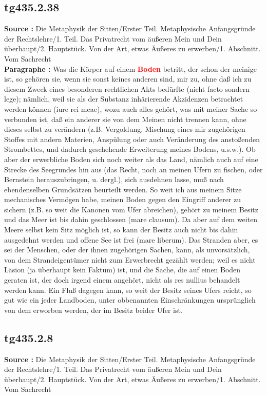 \documentclass[a4paper,12pt,twoside]{book}
\newcommand{\match}[1]{\textcolor{red}{\textbf{#1}}}
\begin{document}
	\subsection*{tg435.2.38} 
	\textbf{Source : }Die Metaphysik der Sitten/Erster Teil. Metaphysische Anfangsgründe der Rechtslehre/1. Teil. Das Privatrecht vom äußeren Mein und Dein überhaupt/2. Hauptstück. Von der Art, etwas Äußeres zu erwerben/1. Abschnitt. Vom Sachrecht\\  
	
	\textbf{Paragraphe : }Was die Körper auf einem \match{Boden} betritt, der schon der meinige ist, so gehören sie, wenn sie sonst keines anderen sind, mir zu, ohne daß ich zu diesem Zweck eines besonderen rechtlichen Akts bedürfte (nicht facto sondern lege); nämlich, weil sie als der Substanz inhärierende Akzidenzen betrachtet werden können (iure rei  meae), wozu auch alles gehört, was mit meiner Sache so verbunden ist, daß ein anderer sie von dem Meinen nicht trennen kann, ohne dieses selbst zu verändern (z.B. Vergoldung, Mischung eines mir zugehörigen Stoffes mit andern Materien, Anspülung oder auch Veränderung des anstoßenden Strombettes, und dadurch geschehende Erweiterung meines Bodens, u.s.w.). Ob aber der erwerbliche Boden sich noch weiter als das Land, nämlich auch auf eine Strecke des Seegrundes hin aus (das Recht, noch an meinen Ufern zu fischen, oder Bernstein herauszubringen, u. dergl.), sich ausdehnen lasse, muß nach ebendenselben Grundsätzen beurteilt werden. So weit ich aus meinem Sitze mechanisches Vermögen habe, meinen Boden gegen den Eingriff anderer zu sichern (z.B. so weit die Kanonen vom Ufer abreichen), gehört zu meinem Besitz und das Meer ist bis dahin geschlossen (mare clausum). Da aber auf dem weiten Meere selbst kein Sitz möglich ist, so kann der Besitz auch nicht bis dahin ausgedehnt werden und offene See ist frei (mare liberum). Das Stranden aber, es sei der Menschen, oder der ihnen zugehörigen Sachen, kann, als unvorsätzlich, von dem Strandeigentümer nicht zum Erwerbrecht gezählt werden; weil es nicht Läsion (ja überhaupt kein Faktum) ist, und die Sache, die auf einen Boden geraten ist, der doch irgend einem angehört, nicht als res nullius behandelt werden kann. Ein Fluß dagegen kann, so weit der Besitz seines Ufers reicht, so gut wie ein jeder Landboden, unter obbenannten Einschränkungen ursprünglich von dem erworben werden, der im Besitz beider Ufer ist. 
	
	\subsection*{tg435.2.8} 
	\textbf{Source : }Die Metaphysik der Sitten/Erster Teil. Metaphysische Anfangsgründe der Rechtslehre/1. Teil. Das Privatrecht vom äußeren Mein und Dein überhaupt/2. Hauptstück. Von der Art, etwas Äußeres zu erwerben/1. Abschnitt. Vom Sachrecht\\  
	
\end{document}
